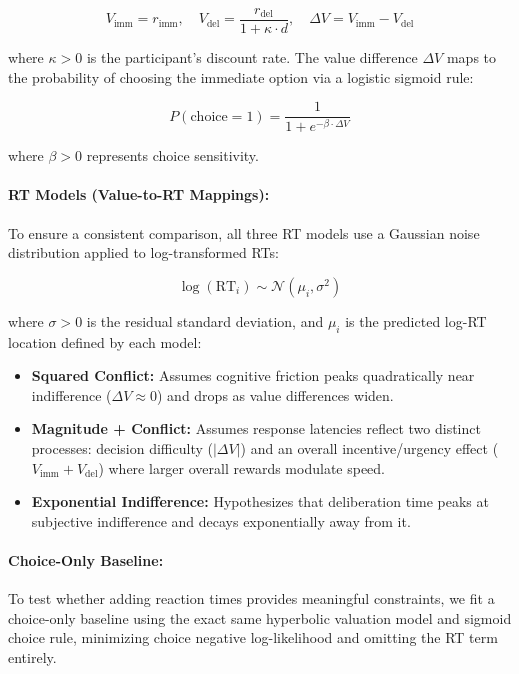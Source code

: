 \documentclass[11pt,a4paper]{article}
\theoremstyle{definition}
\begin{document}
\begin{equation}
    V_{\text{imm}} = r_{\text{imm}}, \quad
    V_{\text{del}} = \frac{r_{\text{del}}}{1 + \kappa \cdot d}, \quad
    \Delta V = V_{\text{imm}} - V_{\text{del}}
\end{equation}

where $\kappa > 0$ is the participant's discount rate. The value difference $\Delta V$ maps to the probability of choosing the immediate option via a logistic sigmoid rule:

\begin{equation}
    P(\text{choice} = 1) = \frac{1}{1 + e^{-\beta \cdot \Delta V}}
\end{equation}

where $\beta > 0$ represents choice sensitivity.

\paragraph{RT Models (Value-to-RT Mappings):}
To ensure a consistent comparison, all three RT models use a Gaussian noise distribution applied to log-transformed RTs:

\begin{equation}
    \log(\text{RT}_i) \sim \mathcal{N}(\mu_i, \sigma^2)
\end{equation}

where $\sigma > 0$ is the residual standard deviation, and $\mu_i$ is the predicted log-RT location defined by each model:

\begin{itemize}
    \item \textbf{Squared Conflict:} Assumes cognitive friction peaks quadratically near indifference ($\Delta V \approx 0$) and drops as value differences widen.
    \item \textbf{Magnitude + Conflict:} Assumes response latencies reflect two distinct processes: decision difficulty ($|\Delta V|$) and an overall incentive/urgency effect ($V_{\text{imm}} + V_{\text{del}}$) where larger overall rewards modulate speed.
    \item \textbf{Exponential Indifference:} Hypothesizes that deliberation time peaks at subjective indifference and decays exponentially away from it.
\end{itemize}

\paragraph{Choice-Only Baseline:}
To test whether adding reaction times provides meaningful constraints, we fit a choice-only baseline using the exact same hyperbolic valuation model and sigmoid choice rule, minimizing choice negative log-likelihood and omitting the RT term entirely.
\end{document}
